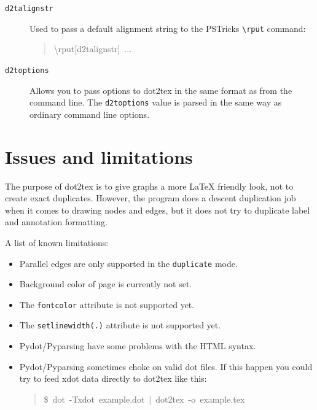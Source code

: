 \documentclass[10pt,a4paper,english]{article}
\begin{document}
\begin{description}
\item[{\texttt{d2talignstr}}] \leavevmode 
Used to pass a default alignment string to the PSTricks \texttt{{\textbackslash}rput} command:
\begin{quote}{\ttfamily \raggedright \noindent
{\textbackslash}rput{[}d2talignstr{]}~...
}\end{quote}

\item[{\texttt{d2toptions}}] \leavevmode 
Allows you to pass options to dot2tex in the same format as from the command line. The \texttt{d2toptions} value is parsed in the same way as ordinary command line options.

\end{description}



\hypertarget{issues-and-limitations}{}
\section*{Issues and limitations}
\label{issues-and-limitations}

The purpose of dot2tex is to give graphs a more LaTeX friendly look, not to create exact duplicates. However, the program does a descent duplication job when it comes to drawing nodes and edges, but it does not try to duplicate label and annotation formatting.

A list of known limitations:
\begin{itemize}
\item {} 
Parallel edges are only supported in the \texttt{duplicate} mode.

\item {} 
Background color of page is currently not set.

\item {} 
The \texttt{fontcolor} attribute is not supported yet.

\item {} 
The \texttt{setlinewidth(.)} attribute is not supported yet.

\item {} 
Pydot/Pyparsing have some problems with the HTML syntax.

\item {} 
Pydot/Pyparsing sometimes choke on valid dot files. If this happen you could try to feed xdot data directly to dot2tex like this:
\begin{quote}{\ttfamily \raggedright \noindent
{\$}~dot~-Txdot~example.dot~|~dot2tex~-o~example.tex
}\end{quote}

\end{itemize}
\end{document}
